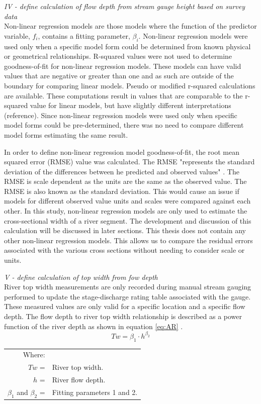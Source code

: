 \begin{linenumbers}
\emph{IV - define calculation of flow depth from stream gauge height based on survey data}\\

Non-linear regression models are those models where the function of the predictor variable, $f_i$, contains a fitting parameter, $\beta_i$.  Non-linear regression models were used only when a specific model form could be determined from known physical or geometrical relationships.  R-squared values were not used to determine goodness-of-fit for non-linear regression models.  These models can have valid values that are negative or greater than one \parencite{spiess2010evaluation} and as such are outside of the boundary for comparing linear models.  Pseudo or modified r-squared calculations are available.  These computations result in values that are comparable to the r-squared value for linear models, but have slightly different interpretations (reference).  Since non-linear regression models were used only when specific model forms could be pre-determined, there was no need to compare different model forms estimating the same result.

In order to define non-linear regression model goodness-of-fit, the root mean squared error (RMSE) value was calculated.  The RMSE "represents the standard deviation of the differences between he predicted and observed values" \parencite{Wiki:RMSE}.  The RMSE is scale dependent as the units are the same as the observed value.  The RMSE is also known as the standard deviation.  This would cause an issue if models for different observed value units and scales were compared against each other.  In this study, non-linear regression models are only used to estimate the cross-sectional width of a river segment.  The development and discussion of this calculation will be discussed in later sections.  This thesis does not contain any other non-linear regression models.  This allows us to compare the residual errors associated with the various cross sections without needing to consider scale or units.

\emph{V - define calculation of top width from fow depth}\\
River top width measurements are only recorded during manual stream gauging performed to update the stage-discharge rating table associated with the gauge.  These measured values are only valid for a specific location and a specific flow depth.  The flow depth to river top width relationship is described as a power function of the river depth as shown in equation \ref{eq:AR} \parencite{Buhman2002,Gates1996}.  
\begin{equation}
	Tw=\beta_{1} \cdot h^{\beta_{2}}
	\label{eq:AR}
\end{equation}
\begin{tabular}{rl}
	Where: & \\
	$Tw$ =&River top width. \\
	$h$ =&River flow depth. \\
	$\beta_{1}$ and $\beta_{2}$ =&Fitting parameters 1 and 2. \\
\end{tabular} \\


\end{linenumbers}
